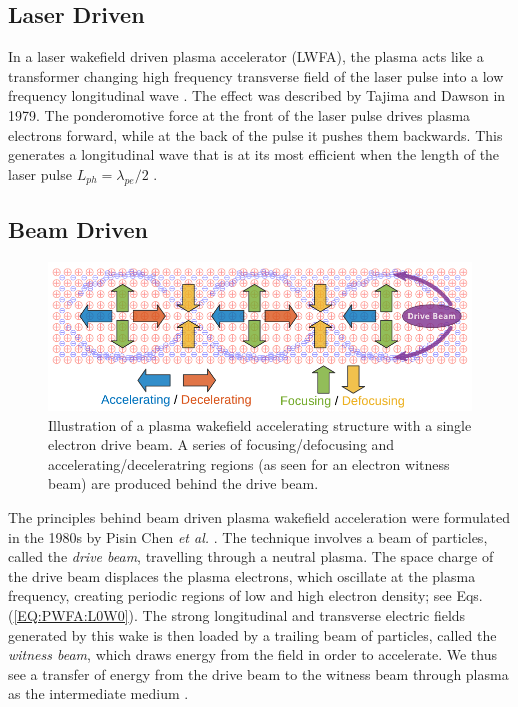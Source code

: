 \subsection{Laser Driven}
\label{Int:LWFA}

In a laser wakefield driven plasma accelerator (LWFA), the plasma acts like a transformer changing high frequency transverse field of the laser pulse into a low frequency longitudinal wave \cite{malka:2009}. The effect was described by Tajima and Dawson in 1979. The ponderomotive force at the front of the laser pulse drives plasma electrons forward, while at the back of the pulse it pushes them backwards. This generates a longitudinal wave that is at its most efficient when the length of the laser pulse $L_{ph} = \lambda_{pe}/2$ \cite{tajima:1979}.

\subsection{Beam Driven}
\label{Int:BDPWFA}

\begin{figure}[hbt]
    \centering
    \includegraphics[width=0.85\linewidth,trim={0mm 0mm 0mm 0mm},clip]{figures/PlasmaWakefield}
    \caption{\label{Fig:PWFA:Illust} Illustration of a plasma wakefield accelerating structure with a single electron drive beam. A series of focusing/defocusing and accelerating/deceleratring regions (as seen for an electron witness beam) are produced behind the drive beam.}
\end{figure}

The principles behind beam driven plasma wakefield acceleration were formulated in the 1980s by Pisin Chen \emph{et al.} \cite{chen:1985}. The technique involves a beam of particles, called the \emph{drive beam}, travelling through a neutral plasma. The space charge of the drive beam displaces the plasma electrons, which oscillate at the plasma frequency, creating periodic regions of low and high electron density; see Eqs. (\ref{EQ:PWFA:L0W0}). The strong longitudinal and transverse electric fields generated by this wake is then loaded by a trailing beam of particles, called the \emph{witness beam}, which draws energy from the field in order to accelerate. We thus see a transfer of energy from the drive beam to the witness beam through plasma as the intermediate medium \cite{muggli:2009}.

